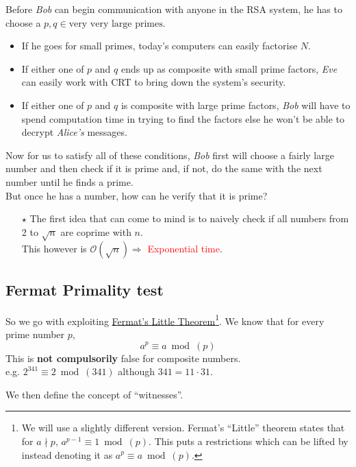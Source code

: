 		Before \emph{Bob} can begin communication with anyone in the RSA system, he has to choose a \(p, q\in \text{very very large primes}\). \\
		\begin{itemize}
			\item If he goes for small primes, today's computers can easily factorise $N$.
			\item If either one of $p$ and $q$ ends up as composite with small prime factors, \emph{Eve} can easily work with CRT to bring down the system's security. 
			\item If either one of $p$ and $q$ is composite with large prime factors, \emph{Bob} will have to spend computation time in trying to find the factors else he won't be able to decrypt \emph{Alice's} messages.
		\end{itemize}
		Now for us to satisfy all of these conditions, \emph{Bob} first will choose a fairly large number and then check if it is prime and, if not, do the same with the next number until he finds a prime.\\
		But once he has a number, how can he verify that it is prime?
		\begin{itemize}
			\item[\(\star\)] The first idea that can come to mind is to naively check if all numbers from 2 to \(\sqrt{n}\) are coprime with $n$.\\This however is \(\mathcal{O}(\sqrt{n})\Rightarrow\) \textcolor{red}{Exponential time}.
		\end{itemize}
		\subsection{Fermat Primality test}
			So we go with exploiting \hyperref[sec:fermat]{Fermat's Little Theorem}\footnote{We will use a slightly different version. Fermat's ``Little'' theorem states that for \(a\nmid p\text{, }a^{p-1}\equiv 1 \bmod(p)\). This puts a restrictions which can be lifted by instead denoting it as \(a^p \equiv a \bmod(p)\).}. We know that for every prime number \(p\), \[a^p \equiv a \bmod(p)\]This is \textbf{not compulsorily} false for composite numbers. \\e.g. \(2^{341}\equiv 2 \bmod(341)\) although \(341 = 11 \cdot 31\). \par
			We then define the concept of ``witnesses''.

